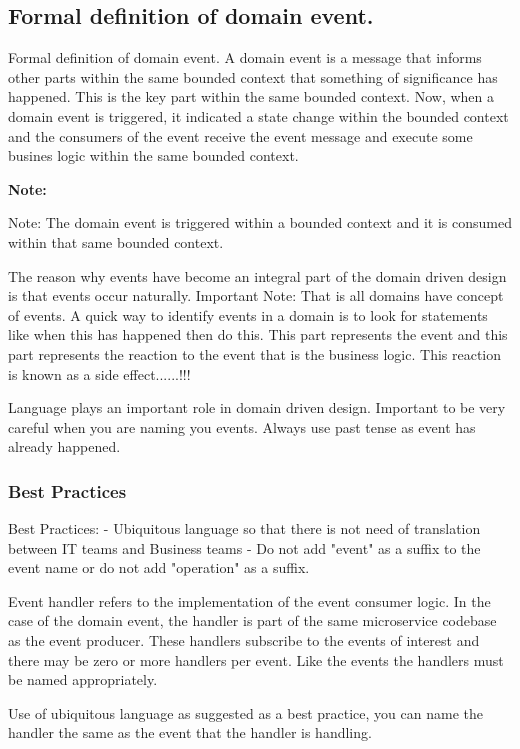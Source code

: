 \documentclass[a4paper, 11pt]{book}
\newenvironment{note}{
    \begin{siderule}
        \textbf{Note: }
        }{
    \end{siderule}
}
\begin{document}
    \subsection{Formal definition of domain event.}
    Formal definition of domain event.
    A domain event is a message that informs other parts within the same bounded context that something of significance has happened.
    This is the key part within the same bounded context.
    Now, when a domain event is triggered, it indicated a state change within the bounded context and the consumers of the event receive the event message and execute some busines logic within the same bounded context.
    \begin{note}
        Note: The domain event is triggered within a bounded context and it is consumed within that same bounded context.
    \end{note}
    The reason why events have become an integral part of the domain driven design is that events occur naturally.
    Important Note: That is all domains have concept of events.
    A quick way to identify events in a domain is to look for statements like when this has happened then do this.
    This part represents the event and this part represents the reaction to the event that is the business logic.
    This reaction is known as a side effect......!!!

    Language plays an important role in domain driven design.
    Important to be very careful when you are naming you events.
    Always use past tense as event has already happened.

    \subsubsection{Best Practices}
    Best Practices:
    - Ubiquitous language so that there is not need of translation between IT teams and Business teams
    - Do not add "event" as a suffix to the event name or do not add "operation" as a suffix.

    Event handler refers to the implementation of the event consumer logic.
    In the case of the domain event, the handler is part of the same microservice codebase as the event producer.
    These handlers subscribe to the events of interest and there may be zero or more handlers per event.
    Like the events the handlers must be named appropriately.

    Use of ubiquitous language as suggested as a best practice, you can name the handler the same as the event that the handler is handling.
\end{document}
